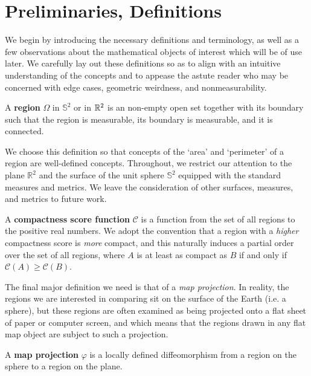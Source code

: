 \section{Preliminaries, Definitions}\label{sec:prelims}

We begin by introducing the necessary definitions and terminology, as
well as a few observations about the mathematical objects of interest
which will be of use later.  We carefully lay out these definitions so
as to align with an intuitive understanding of the concepts and to
appease the astute reader who may be concerned with edge cases,
geometric weirdness, and nonmeasurability.

\begin{definition}
  A \textbf{region} $\Omega$ in $\mathbb{S}^2$ or 
  in $\mathbb{R}^2$ is an non-empty open set together with its
  boundary such that the region is measurable, its boundary is
  measurable, and it is connected.
\end{definition}

We choose this definition so that concepts of the `area' and
`perimeter' of a region are well-defined concepts.  Throughout, we
restrict our attention to the plane $\mathbb{R}^2$ and the surface of the unit sphere $\mathbb{S}^2$ equipped
with the standard measures and metrics.  We leave the consideration of
other surfaces, measures, and metrics to future work.

\begin{definition}
  A \textbf{compactness score function} $\mathcal{C}$ is a function from
  the set of all regions to the positive real numbers.  We adopt the
  convention that a region with a \textit{higher} compactness score is
  \textit{more} compact, and this naturally induces a partial order over
  the set of all regions, where $A$ is at least as compact as $B$ if and
  only if $\mathcal{C}(A)\geq \mathcal{C}(B)$.
\end{definition}

The final major definition we need is that of a \textit{map
projection}.  In reality, the regions we are interested in comparing
sit on the surface of the Earth (i.e. a sphere), but these regions are
often examined as being projected onto a flat sheet of paper or
computer screen, and which means that the regions drawn in any flat
map object are subject to such a projection.

\begin{definition}
  A \textbf{map projection} $\varphi$ is a locally defined 
  diffeomorphism from a region on the sphere to a region on the 
  plane. 
\end{definition}

